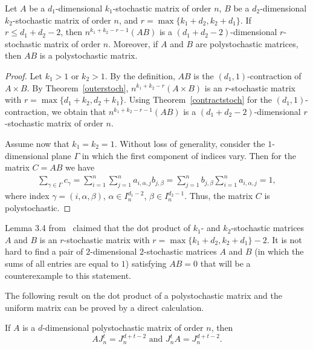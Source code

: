 \documentclass[a4paper]{article}
\begin{document}
\begin{teorema} \label{dotstoch}
Let $A$ be a $d_1$-dimensional $k_1$-stochastic matrix of order $n$,  $B$  be a $d_2$-dimensional $k_2$-stochastic matrix of order $n$, and $r = \max \{  k_1 + d_2, k_2 + d_1\} $. If $r \leq d_1 + d_2 -2$, then $n^{k_1 + k_2 - r -1} (AB)$ is a $(d_1 + d_2 -2)$-dimensional  $r$-stochastic matrix of order $n$. Moreover, if $A$ and $B$ are polystochastic matrices, then $AB$ is a polystochastic matrix. 
\end{teorema}  
\begin{proof}
Let $k_1 > 1$ or $k_2 > 1$.  By the definition, $AB$ is the $(d_1, 1)$-contraction of $A \times B$. By Theorem~\ref{outerstoch}, $n^{k_1 + k_2 - r} (A \times B)$ is an $r$-stochastic matrix with $r = \max\{ d_1 +k_2, d_2 + k_1 \}$. Using Theorem~\ref{contractstoch} for the $(d_1,1)$-contraction, we obtain that $ n^{k_1 + k_2 - r -1} (AB)$ is a $(d_1 + d_2 -2)$-dimensional  $r$-stochastic matrix of order $n$.

Assume now that  $k_1 = k_2  = 1$. Without loss of generality, consider the $1$-dimensional plane $\Gamma$ in which the first component of indices vary.  Then for the matrix $C = AB$ we have
\begin{gather*}
\sum \limits_{\gamma \in \Gamma} c_\gamma =  \sum\limits_{i = 1}^n \sum\limits_{j = 1 }^n   a_{i,  \alpha, j } b_{j, \beta}  = 
\sum\limits_{j = 1}^n    b_{j, \beta}  \sum\limits_{i = 1}^n   a_{i,  \alpha, j }  =1,
 \end{gather*}
 where index $\gamma = (i, \alpha, \beta)$, $\alpha \in I_n^{d_1 -2}$, $\beta \in I_n^{d_2-1}$.
Thus, the matrix $C$ is  polystochastic.
\end{proof}


Lemma 3.4 from~\cite{ChildWan.multper} claimed that the dot product of $k_1$- and $k_2$-stochastic matrices $A$ and $B$ is an $r$-stochastic matrix with $r = \max \{  k_1 + d_2, k_2 + d_1\} -2$. It is not hard to find a pair of $2$-dimensional $2$-stochastic matrices $A$ and $B$ (in which the sums of all entries are equal to $1$) satisfying $AB = 0$ that will be a counterexample to this statement. 

The following result on the dot product of a polystochastic matrix and the uniform matrix can be proved by a direct calculation. 


\begin{utv} \label{dotuniform}
If $A$ is a $d$-dimensional polystochastic matrix of order $n$, then
$$A  J^t_n = J^{d+t-2}_n \mbox { and } J^t_n A = J^{d+t-2}_n.$$ 
\end{utv}
\end{document}
